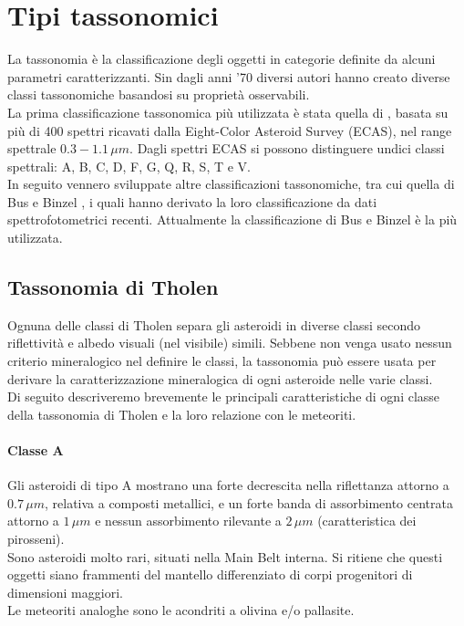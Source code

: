 \section{Tipi tassonomici}
La tassonomia è la classificazione degli oggetti in categorie definite da alcuni parametri caratterizzanti. Sin dagli anni '70 diversi autori hanno creato diverse classi tassonomiche basandosi su proprietà osservabili.\\
La prima classificazione tassonomica più utilizzata è stata quella di \citet{tholen_asteroid_1984}, basata su più di 400 spettri ricavati dalla Eight-Color Asteroid Survey (ECAS), nel range spettrale $0.3-1.1\,\mu m$. Dagli spettri ECAS si possono distinguere undici classi spettrali: A, B, C, D, F, G, Q, R, S, T e V.\\
In seguito vennero sviluppate altre classificazioni tassonomiche, tra cui quella di Bus e Binzel \citep{bus_phase_2002-1, bus_phase_2002}, i quali hanno derivato la loro classificazione da dati spettrofotometrici recenti. Attualmente la classificazione di Bus e Binzel è la più utilizzata.

\subsection{Tassonomia di Tholen}
Ognuna delle classi di Tholen separa gli asteroidi in diverse classi secondo riflettività e albedo visuali (nel visibile) simili. Sebbene non venga usato nessun criterio mineralogico nel definire le classi, la tassonomia può essere usata per derivare la caratterizzazione mineralogica di ogni asteroide nelle varie classi.\\
Di seguito descriveremo brevemente le principali caratteristiche di ogni classe della tassonomia di Tholen e la loro relazione con le meteoriti. 

\paragraph*{Classe A}
Gli asteroidi di tipo A mostrano una forte decrescita nella riflettanza attorno a $0.7\,\mu m$, relativa a composti metallici, e un forte banda di assorbimento centrata attorno a $1\,\mu m$ e nessun assorbimento rilevante a $2\,\mu m$ (caratteristica dei pirosseni).\\
Sono asteroidi molto rari, situati nella Main Belt interna. Si ritiene che questi oggetti siano frammenti del mantello differenziato di corpi progenitori di dimensioni maggiori.\\
Le meteoriti analoghe sono le acondriti a olivina e/o pallasite.

